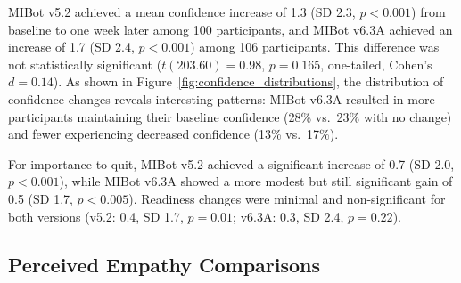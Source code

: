 MIBot v5.2 achieved a mean confidence increase of 1.3 (SD 2.3, $p<0.001$) 
from baseline to one week later among 100 participants, and 
MIBot v6.3A achieved an increase of 1.7 (SD 2.4, $p<0.001$) among 106 participants.  
This difference was not statistically significant ($t(203.60) = 0.98$, 
$p = 0.165$, one-tailed, Cohen's $d = 0.14$). As shown in Figure~\ref{fig:confidence_distributions}, 
the distribution of confidence changes reveals interesting patterns: MIBot v6.3A 
resulted in more participants maintaining their baseline confidence (28\% vs.\ 23\% 
with no change) and fewer experiencing decreased confidence (13\% vs.\ 17\%).

For importance to quit, MIBot v5.2 achieved a significant increase of 0.7 (SD 2.0, $p<0.001$), while MIBot v6.3A showed a more modest but still significant gain of 0.5 (SD 1.7, $p<0.005$). Readiness changes were minimal and non-significant for both versions (v5.2: 0.4, SD 1.7, $p=0.01$; v6.3A: 0.3, SD 2.4, $p=0.22$).

\subsection{Perceived Empathy Comparisons}


